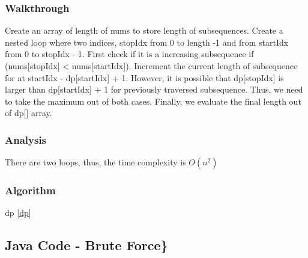 \documentclass[]{book}
\begin{document}
\hypertarget{walkthrough-27}{%
\subsubsection{Walkthrough}\label{walkthrough-27}}

Create an array of length of nums to store length of subsequences. Create a nested loop where two indices, stopIdx
from 0 to length -1 and from startIdx from 0 to stopIdx - 1. First check if it is a increasing subsequence if
(nums{[}stopIdx{]} \textless{} nums{[}startIdx{]}). Increment the current length of subsequence for at startIdx - dp{[}startIdx{]} + 1.
However, it is possible that dp{[}stopIdx{]} is larger than dp{[}startIdx{]} + 1 for previously traversed subsequence. Thus,
we need to take the maximum out of both cases. Finally, we evaluate the final length out of dp{[}{]} array.

\hypertarget{analysis-30}{%
\subsubsection{Analysis}\label{analysis-30}}

There are two loops, thus, the time complexity is \(O(n^2)\)

\hypertarget{algorithm-30}{%
\subsubsection{Algorithm}\label{algorithm-30}}

dp \ref{dp}

\hypertarget{java-code---brute-force}{%
\subsection{Java Code - Brute Force\}}\label{java-code---brute-force}}
\end{document}

